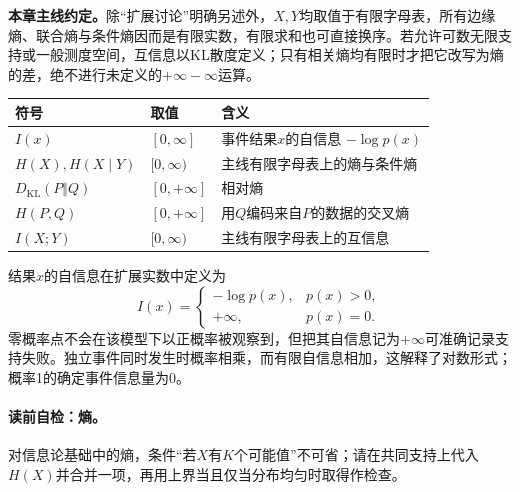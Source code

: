 \label{struct:V1-C06-CH05}
\textbf{本章主线约定。}除“扩展讨论”明确另述外，$X,Y$均取值于有限字母表，所有边缘熵、联合熵与条件熵因而是有限实数，有限求和也可直接换序。若允许可数无限支持或一般测度空间，互信息以KL散度定义；只有相关熵均有限时才把它改写为熵的差，绝不进行未定义的$+\infty-\infty$运算。
\begin{symboltablebox}
\begin{tabularx}{\linewidth}{@{}l l X@{}}
\toprule 符号 & 取值 & 含义\\ \midrule
$I(x)$ & $[0,\infty]$ & 事件结果$x$的自信息 $-\log p(x)$\\
$H(X),H(X\mid Y)$ & $[0,\infty)$ & 主线有限字母表上的熵与条件熵\\
$D_{\mathrm{KL}}(P\Vert Q)$ & $[0,+\infty]$ & 相对熵\\
$H(P,Q)$ & $[0,+\infty]$ & 用$Q$编码来自$P$的数据的交叉熵\\
$I(X;Y)$ & $[0,\infty)$ & 主线有限字母表上的互信息\\
\bottomrule
\end{tabularx}
\end{symboltablebox}

\label{struct:V1-C06-CH06}
结果$x$的自信息在扩展实数中定义为
\[
I(x)=
\begin{cases}
-\log p(x),&p(x)>0,\\
+\infty,&p(x)=0.
\end{cases}
\]
零概率点不会在该模型下以正概率被观察到，但把其自信息记为$+\infty$可准确记录支持失败。独立事件同时发生时概率相乘，而有限自信息相加，这解释了对数形式；概率1的确定事件信息量为0。

\paragraph{读前自检：熵。}对信息论基础中的熵，条件“若$X$有$K$个可能值”不可省；请在共同支持上代入$H(X)$并合并一项，再用上界当且仅当分布均匀时取得作检查。\par

